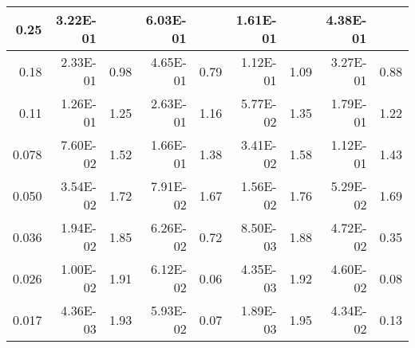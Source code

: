 \begin{table}[htbp]
\caption{}
\begin{tabular}{|r|r|r|r|r|r|r|r|r|}
\hline
0.25 & 3.22E-01 & \multicolumn{1}{l|}{} & 6.03E-01 & \multicolumn{1}{l|}{} & 1.61E-01 & \multicolumn{1}{l|}{} & 4.38E-01 & \multicolumn{1}{l|}{} \\ \hline
0.18 & 2.33E-01 & 0.98 & 4.65E-01 & 0.79 & 1.12E-01 & 1.09 & 3.27E-01 & 0.88 \\ \hline
0.11 & 1.26E-01 & 1.25 & 2.63E-01 & 1.16 & 5.77E-02 & 1.35 & 1.79E-01 & 1.22 \\ \hline
0.078 & 7.60E-02 & 1.52 & 1.66E-01 & 1.38 & 3.41E-02 & 1.58 & 1.12E-01 & 1.43 \\ \hline
0.050 & 3.54E-02 & 1.72 & 7.91E-02 & 1.67 & 1.56E-02 & 1.76 & 5.29E-02 & 1.69 \\ \hline
0.036 & 1.94E-02 & 1.85 & 6.26E-02 & 0.72 & 8.50E-03 & 1.88 & 4.72E-02 & 0.35 \\ \hline
0.026 & 1.00E-02 & 1.91 & 6.12E-02 & 0.06 & 4.35E-03 & 1.92 & 4.60E-02 & 0.08 \\ \hline
0.017 & 4.36E-03 & 1.93 & 5.93E-02 & 0.07 & 1.89E-03 & 1.95 & 4.34E-02 & 0.13 \\ \hline
\end{tabular}
\label{}
\end{table}
